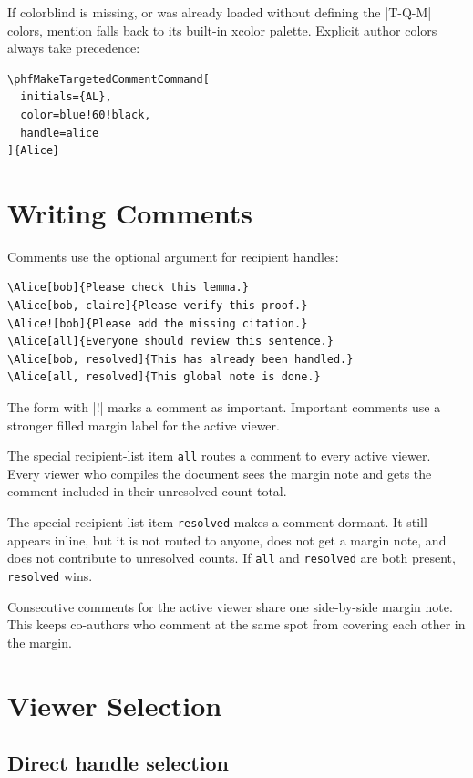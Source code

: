 \documentclass{ltxdoc}
\newcommand*\pkg[1]{\textsf{#1}}
\newcommand*\opt[1]{\texttt{#1}}
\begin{document}
If \pkg{colorblind} is missing, or was already loaded without defining the
|T-Q-M| colors, \pkg{mention} falls back to its built-in \pkg{xcolor} palette.
Explicit author colors always take precedence:

\begin{verbatim}
\phfMakeTargetedCommentCommand[
  initials={AL},
  color=blue!60!black,
  handle=alice
]{Alice}
\end{verbatim}

\section{Writing Comments}

Comments use the optional argument for recipient handles:

\begin{verbatim}
\Alice[bob]{Please check this lemma.}
\Alice[bob, claire]{Please verify this proof.}
\Alice![bob]{Please add the missing citation.}
\Alice[all]{Everyone should review this sentence.}
\Alice[bob, resolved]{This has already been handled.}
\Alice[all, resolved]{This global note is done.}
\end{verbatim}

The form with |!| marks a comment as important.  Important comments use a
stronger filled margin label for the active viewer.

The special recipient-list item \opt{all} routes a comment to every active
viewer.  Every viewer who compiles the document sees the margin note and gets
the comment included in their unresolved-count total.

The special recipient-list item \opt{resolved} makes a comment dormant.  It
still appears inline, but it is not routed to anyone, does not get a margin
note, and does not contribute to unresolved counts.  If \opt{all} and
\opt{resolved} are both present, \opt{resolved} wins.

Consecutive comments for the active viewer share one side-by-side margin note.
This keeps co-authors who comment at the same spot from covering each other in
the margin.

\section{Viewer Selection}

\subsection{Direct handle selection}
\end{document}
